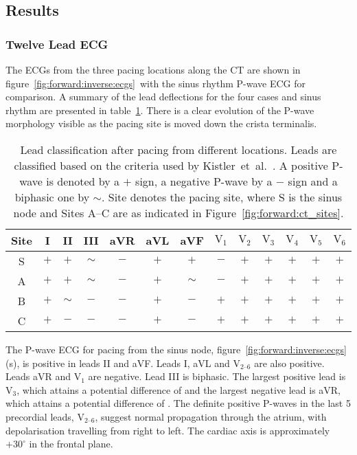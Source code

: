 \subsection{Results}

\subsubsection{Twelve Lead ECG}

The ECGs from the three pacing locations along the CT are shown in
figure~\ref{fig:forward:inverse:ecgs}\ with the sinus rhythm P-wave ECG for
comparison.
A summary of the lead deflections for the four cases and sinus rhythm are
presented in table~\ref{tbl:forward:inverse:ecgs}.
There is a clear evolution of the P-wave morphology visible as the pacing site
is moved down the crista terminalis.

\begin{table}
\caption[Lead classification under pacing from different locations]{
\label{tbl:forward:inverse:ecgs}
Lead classification after pacing from different locations.
Leads are classified based on the criteria used by
Kistler~et~al.~\cite{Kistler2006}.
A positive P-wave is denoted by a $+$ sign, a negative P-wave by a $-$ sign and
a biphasic one by $\sim$.
Site denotes the pacing site, where S is the sinus node and Sites A--C are as
indicated in Figure~\ref{fig:forward:ct_sites}.
}
\begin{center}
\begin{tabular}{c c c c c c c c c c c c c}
\toprule
Site & I & II & III & aVR & aVL & aVF & $\text{V}_{\text{1}}$ &$\text{V}_{\text{2}}$ & $\text{V}_{\text{3}}$ & $\text{V}_{\text{4}}$ & $\text{V}_{\text{5}}$ & $\text{V}_{\text{6}}$\\
\midrule
S   & $+$ & $+$ & $\sim$ & $-$ & $+$ & $+$ & $-$ & $+$ & $+$ & $+$ & $+$ & $+$ \\
A   & $+$ & $+$ & $\sim$ & $-$ & $+$ & $\sim$ & $-$ & $+$ & $+$ & $+$ & $+$ & $+$ \\
B   & $+$ & $\sim$ & $-$ & $-$ & $+$ & $-$ & $+$ & $+$ & $+$ & $+$ & $+$ & $+$ \\
C   & $+$ & $-$ & $-$ & $-$ & $+$ & $-$ & $+$ & $+$ & $+$ & $+$ & $+$ & $+$ \\
\bottomrule
\end{tabular}
\end{center}
\end{table}

The P-wave ECG for pacing from the sinus node,
figure~\ref{fig:forward:inverse:ecgs}(s), is positive in leads II and aVF.
Leads I, aVL and $\text{V}_{\text{2--6}}$ are also positive.
Leads aVR and $\text{V}_{\text{1}}$ are negative.
Lead III is biphasic.
The largest positive lead is $\text{V}_{\text{3}}$, which attains a potential
difference of  and the largest negative lead is aVR,
which attains a potential difference of .
The definite positive P-waves in the last 5 precordial leads,
$\text{V}_{\text{2--6}}$, suggest normal propagation through the atrium, with
depolarisation travelling from right to left.
The cardiac axis is approximately $+30^\circ$ in the frontal plane.


